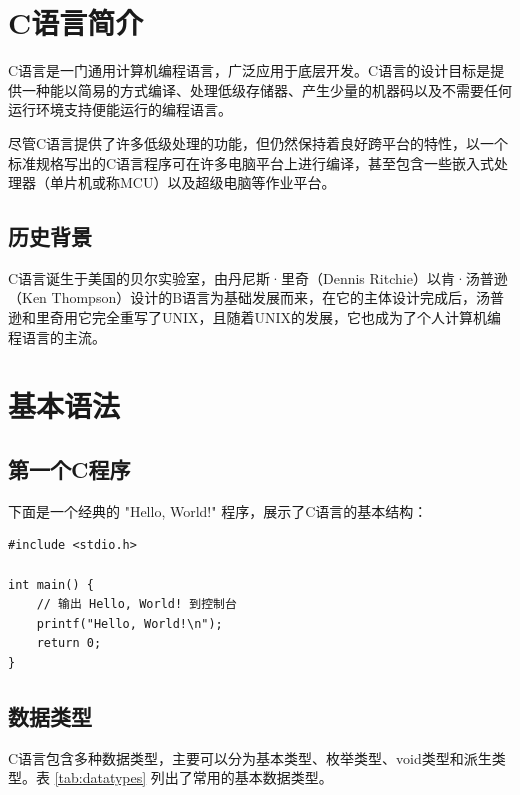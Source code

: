 

\section{C语言简介}

C语言是一门通用计算机编程语言，广泛应用于底层开发。C语言的设计目标是提供一种能以简易的方式编译、处理低级存储器、产生少量的机器码以及不需要任何运行环境支持便能运行的编程语言。

尽管C语言提供了许多低级处理的功能，但仍然保持着良好跨平台的特性，以一个标准规格写出的C语言程序可在许多电脑平台上进行编译，甚至包含一些嵌入式处理器（单片机或称MCU）以及超级电脑等作业平台。

\subsection{历史背景}

C语言诞生于美国的贝尔实验室，由丹尼斯·里奇（Dennis Ritchie）以肯·汤普逊（Ken Thompson）设计的B语言为基础发展而来，在它的主体设计完成后，汤普逊和里奇用它完全重写了UNIX，且随着UNIX的发展，它也成为了个人计算机编程语言的主流。

\newpage

\section{基本语法}

\subsection{第一个C程序}

下面是一个经典的 "Hello, World!" 程序，展示了C语言的基本结构：

\begin{lstlisting}[style=cstyle, caption={Hello World 示例}, label={code:hello}]
#include <stdio.h>

int main() {
    // 输出 Hello, World! 到控制台
    printf("Hello, World!\n");
    return 0;
}
\end{lstlisting}

\subsection{数据类型}

C语言包含多种数据类型，主要可以分为基本类型、枚举类型、void类型和派生类型。表 \ref{tab:datatypes} 列出了常用的基本数据类型。


